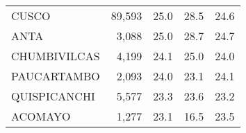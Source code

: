 \begin{tabular}{lrrrr}
	\cellcolor[HTML]{FD6864}CUSCO                                           & 89,593                                                                & 25.0                                                                             & 28.5                                                                        & 24.6                                                                                \\
	\cellcolor[HTML]{FD6864}ANTA                                            & 3,088                                                                 & 25.0                                                                             & 28.7                                                                        & 24.7                                                                                \\
	\cellcolor[HTML]{FD6864}CHUMBIVILCAS                                    & 4,199                                                                 & 24.1                                                                             & 25.0                                                                        & 24.0                                                                                \\
	\cellcolor[HTML]{FD6864}PAUCARTAMBO                                     & 2,093                                                                 & 24.0                                                                             & 23.1                                                                        & 24.1                                                                                \\
	\cellcolor[HTML]{FD6864}QUISPICANCHI                                    & 5,577                                                                 & 23.3                                                                             & 23.6                                                                        & 23.2                                                                                \\
	\cellcolor[HTML]{FD6864}ACOMAYO                                         & 1,277                                                                 & 23.1                                                                             & 16.5                                                                        & 23.5                                                                                \\

\end{tabular}
